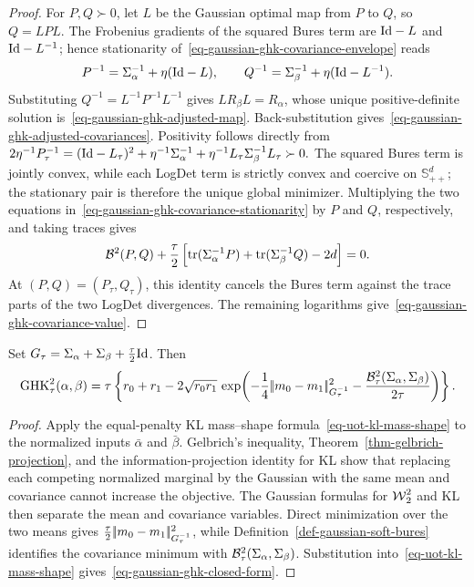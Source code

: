 \begin{proof}
For $P,Q\succ0$, let $L$ be the Gaussian optimal map from $P$ to $Q$, so $Q=LPL$. The Frobenius gradients of the squared Bures term are $\mathrm{Id}-L$ and $\mathrm{Id}-L^{-1}$; hence stationarity of~\eqref{eq-gaussian-ghk-covariance-envelope} reads
\begin{equation}\label{eq-gaussian-ghk-covariance-stationarity}
P^{-1}=\Sigma_\alpha^{-1}+\eta(\mathrm{Id}-L),
\qquad
Q^{-1}=\Sigma_\beta^{-1}+\eta(\mathrm{Id}-L^{-1}).
\end{equation}
Substituting $Q^{-1}=L^{-1}P^{-1}L^{-1}$ gives $LR_\beta L=R_\alpha$, whose unique positive-definite solution is~\eqref{eq-gaussian-ghk-adjusted-map}. Back-substitution gives~\eqref{eq-gaussian-ghk-adjusted-covariances}. Positivity follows directly from
\(2\eta^{-1}P_\tau^{-1} =(\mathrm{Id}-L_\tau)^2 +\eta^{-1}\Sigma_\alpha^{-1} +\eta^{-1}L_\tau\Sigma_\beta^{-1}L_\tau \succ0.\)
The squared Bures term is jointly convex, while each LogDet term is strictly convex and coercive on $\mathbb S_{++}^d$; the stationary pair is therefore the unique global minimizer. Multiplying the two equations in~\eqref{eq-gaussian-ghk-covariance-stationarity} by $P$ and $Q$, respectively, and taking traces gives
\[
\mathcal{B}^2(P,Q)
+\frac{\tau}{2}
\left[
\operatorname{tr}(\Sigma_\alpha^{-1}P)+\operatorname{tr}(\Sigma_\beta^{-1}Q)-2d
\right]
=0.
\]
At $(P,Q)=(P_\tau,Q_\tau)$, this identity cancels the Bures term against the trace parts of the two LogDet divergences. The remaining logarithms give~\eqref{eq-gaussian-ghk-covariance-value}.
\end{proof}
\begin{prop}\label{prop-gaussian-ghk-endpoint}
Set $G_\tau=\Sigma_\alpha+\Sigma_\beta+\frac{\tau}{2}\mathrm{Id}$. Then
\begin{equation}\label{eq-gaussian-ghk-closed-form}
\operatorname{GHK}_\tau^2(\alpha,\beta)
=
\tau\left\{
r_0+r_1
-2\sqrt{r_0r_1}\,
\exp\!\left(
-\frac14|\!| m_0-m_1 |\!|_{G_\tau^{-1}}^2
-\frac{\mathcal{B}_\tau^2(\Sigma_\alpha,\Sigma_\beta)}{2\tau}
\right)
\right\}.
\end{equation}
\end{prop}
\begin{proof}
Apply the equal-penalty KL mass--shape formula~\eqref{eq-uot-kl-mass-shape} to the normalized inputs $\bar\alpha$ and $\bar\beta$. Gelbrich's inequality, Theorem~\ref{thm-gelbrich-projection}, and the information-projection identity for KL show that replacing each competing normalized marginal by the Gaussian with the same mean and covariance cannot increase the objective. The Gaussian formulas for $\operatorname{\mathcal{W}}_2^2$ and KL then separate the mean and covariance variables. Direct minimization over the two means gives $\frac{\tau}{2}|\!| m_0-m_1 |\!|_{G_\tau^{-1}}^2$, while Definition~\ref{def-gaussian-soft-bures} identifies the covariance minimum with $\mathcal{B}_\tau^2(\Sigma_\alpha,\Sigma_\beta)$. Substitution into~\eqref{eq-uot-kl-mass-shape} gives~\eqref{eq-gaussian-ghk-closed-form}.
\end{proof}
